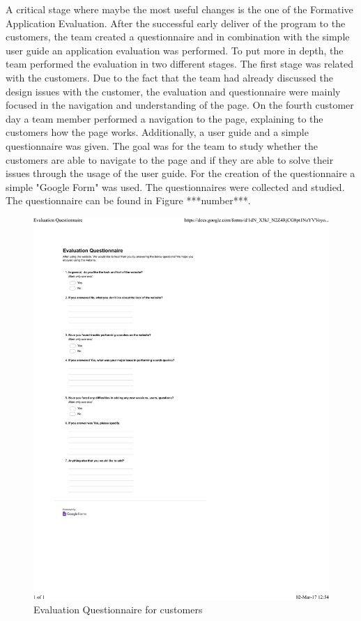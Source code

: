 \documentclass{l3proj}
\begin{document}
A critical stage where maybe the most useful changes is the one of the Formative Application Evaluation. After the successful early deliver of the program to the customers, the team created a questionnaire and in combination with the simple user guide an application evaluation was performed. To put more in depth, the team performed the evaluation in two different stages. The first stage was related with the customers. Due to the fact that the team had already discussed the design issues with the customer, the evaluation and questionnaire were mainly focused in the navigation and understanding of the page. On the  fourth customer day a team member performed a navigation to the page, explaining to the customers how the page works.  Additionally, a user guide and a simple questionnaire was given. The goal was for the team to study whether the customers are able to navigate to the page and if they are able to solve their issues through the usage of the user guide. For the creation of the questionnaire a simple "Google Form" was used. The questionnaires were collected and studied. The questionnaire can be found in Figure ***number***.

\begin{figure}
  \centerline{\includegraphics[width=\textwidth, height=\textheight, keepaspectratio]{evalQuestCustomers.pdf}}
  \caption{Evaluation Questionnaire for customers }
\end{figure}
\end{document}
